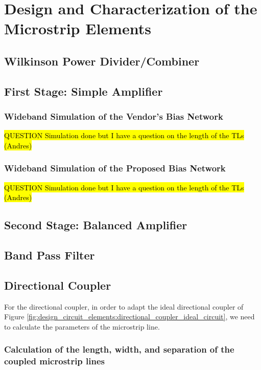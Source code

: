 \documentclass[12pt]{report} %
\newcommand{\question}[1]{\sethlcolor{red}\hl{QUESTION #1}}
\begin{document}
\chapter{Design and Characterization of the Microstrip Elements}

\section{Wilkinson Power Divider/Combiner}



\section{First Stage: Simple Amplifier}


\subsection{Wideband Simulation of the Vendor's Bias Network}

\question{Simulation done but I have a question on the length of the TLs (Andres)}

\subsection{Wideband Simulation of the Proposed Bias Network}

\question{Simulation done but I have a question on the length of the TLs (Andres)}


\section{Second Stage: Balanced Amplifier}
\section{Band Pass Filter}

\section{Directional Coupler}

For the directional coupler, in order to adapt the ideal directional coupler of Figure \ref{fig:design_circuit_elements:directional_coupler_ideal_circuit}, we need to calculate the parameters of the microstrip line.

\subsection{Calculation of the length, width, and separation of the coupled microstrip lines}
\end{document}

